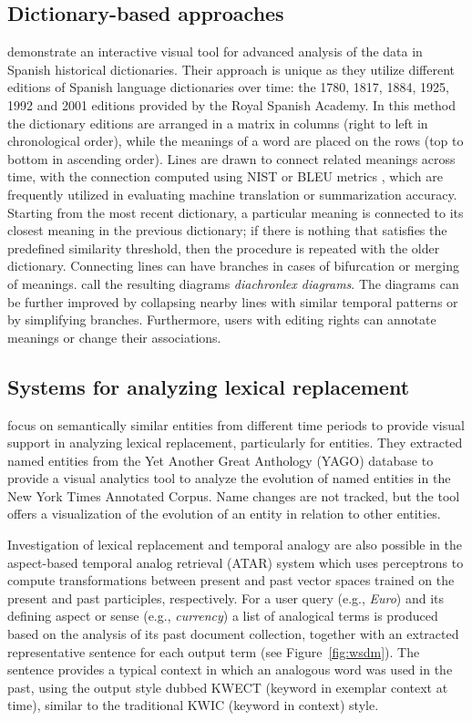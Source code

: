 \documentclass[output=paper%
]{langsci/langscibook}
\begin{document}
\subsection{Dictionary-based approaches}
\citet{theron2015diachronic} demonstrate an interactive visual tool for advanced analysis of the data in Spanish historical dictionaries. Their approach is unique as they utilize different editions of Spanish language dictionaries over time: the 1780, 1817, 1884, 1925, 1992 and 2001 editions provided by the Royal Spanish Academy. 
In this method the dictionary editions are arranged in a matrix in columns (right to left in  chronological order), while the meanings of a word are placed on the rows (top to bottom in ascending order). Lines are drawn to connect  related meanings across time, with the connection computed using  NIST or BLEU metrics \citep{zhang2004interpreting}, which are frequently utilized in evaluating machine translation or summarization accuracy. Starting from the most recent dictionary, a particular meaning is connected to its closest meaning in the previous dictionary; if there is nothing that satisfies the predefined similarity threshold, then the procedure is repeated with the older dictionary. Connecting lines can have branches in cases of bifurcation or merging of meanings. \citet{theron2015diachronic} call the resulting diagrams \emph{diachronlex diagrams}. The diagrams can be further improved by collapsing nearby lines with similar temporal patterns or by simplifying branches. Furthermore, users with editing rights can annotate meanings or change their associations.


\subsection{Systems for analyzing lexical replacement}
\citet{mazeika2011entity} focus on semantically similar entities from different time periods to provide visual support in analyzing lexical replacement, particularly for entities. They extracted named entities from the Yet Another Great Anthology (YAGO) database to provide a visual analytics tool to analyze the evolution of named entities in the New York Times Annotated Corpus. Name changes are not tracked, but the tool offers a visualization of the evolution of an entity in  relation to other entities. 

Investigation of lexical replacement and temporal analogy are also  possible in the aspect-based temporal analog retrieval (ATAR) system \citep{zhangwsdm} which uses perceptrons to compute transformations between present and past vector spaces trained on the present and past participles, respectively. For a user query (e.g., \emph{Euro}) and its defining aspect or sense (e.g., \emph{currency}) a list of analogical terms is produced based on the analysis of its past document collection, together with an extracted representative sentence for each output term (see Figure~\ref{fig:wsdm}). The sentence provides a typical context in which an analogous word was used in the past, using the output style dubbed KWECT (keyword in exemplar context at time), similar to the traditional KWIC (keyword in context) style. 
\end{document}
